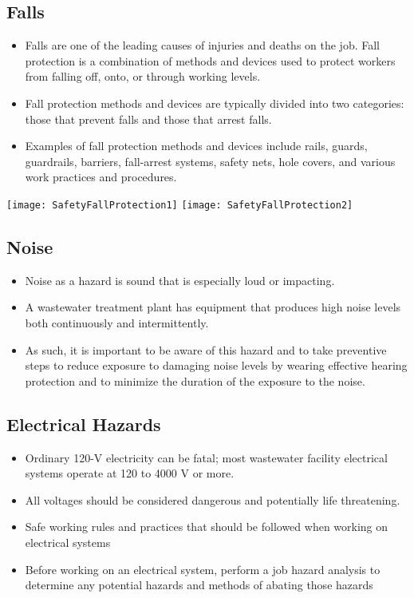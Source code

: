\subsection{Falls}
\begin{itemize}
\item Falls are one of the leading causes of injuries and deaths on the job.  Fall protection is a combination of methods and devices used to protect workers from falling off, onto, or through working levels. 
\item Fall protection methods and devices are typically divided into two categories: those that prevent falls and those that arrest falls. 
\item Examples of fall protection methods and devices include rails, guards, guardrails, barriers, fall-arrest systems, safety nets, hole covers, and various work practices and procedures.
\end{itemize}
\begin{center}
\texttt{[image: SafetyFallProtection1]}\hspace{1cm} \texttt{[image: SafetyFallProtection2]}\\
\end{center}
\subsection{Noise}
\begin{itemize}
\item Noise as a hazard is sound that is especially loud or impacting. 
\item A wastewater treatment plant has equipment that produces high noise levels both continuously and intermittently. 
\item As such, it is important to be aware of this hazard and to take preventive steps to reduce exposure to damaging noise levels by wearing effective hearing protection and to minimize the duration of the exposure to the noise.
\end{itemize}

\subsection{Electrical Hazards}
\begin{itemize}
\item Ordinary 120-V electricity can be fatal; most wastewater facility electrical systems operate at 120 to 4000 V or more.  
\item All voltages should be considered dangerous and potentially life threatening.  
\item Safe working rules and practices that should be followed when working on electrical systems
\item Before working on an electrical system, perform a job hazard analysis to determine any potential hazards and methods of abating those hazards
\end{itemize}


